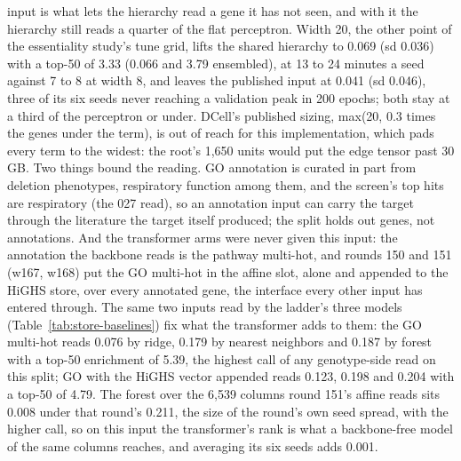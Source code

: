 input is what lets the hierarchy read a gene it has not seen, and with it the hierarchy
still reads a quarter of the flat perceptron. Width 20, the other point of the
essentiality study's tune grid, lifts the shared hierarchy to 0.069 (sd 0.036) with a
top-50 of 3.33 (0.066 and 3.79 ensembled), at 13 to 24 minutes a seed against 7 to 8
at width 8, and leaves the published input at 0.041 (sd 0.046), three of its six seeds
never reaching a validation peak in 200 epochs; both stay at a third of the perceptron
or under. DCell's published sizing, max(20, 0.3 times the genes under the term), is out
of reach for this implementation, which pads every term to the widest: the root's
1,650 units would put the edge tensor past 30 GB.
Two things bound the reading. GO annotation is curated in part from deletion
phenotypes, respiratory function among them, and the screen's top hits are respiratory
(the 027 read), so an annotation input can carry the target through the literature the
target itself produced; the split holds out genes, not annotations. And the transformer
arms were never given this input: the annotation the backbone reads is the pathway
multi-hot, and rounds 150 and 151 (w167, w168) put the GO multi-hot in the affine
slot, alone and appended to the HiGHS store, over every annotated gene, the interface
every other input has entered through. The same two inputs read by the ladder's three
models (Table~\ref{tab:store-baselines}) fix what the transformer adds to them: the GO
multi-hot reads 0.076 by ridge, 0.179 by nearest neighbors and 0.187 by forest with a
top-50 enrichment of 5.39, the highest call of any genotype-side read on this split; GO with the
HiGHS vector appended reads 0.123, 0.198 and 0.204 with a top-50 of 4.79. The forest
over the 6,539 columns round 151's affine reads sits 0.008 under that round's 0.211,
the size of the round's own seed spread, with the higher call, so on this input the
transformer's rank is what a backbone-free model of the same columns reaches, and
averaging its six seeds adds 0.001.

